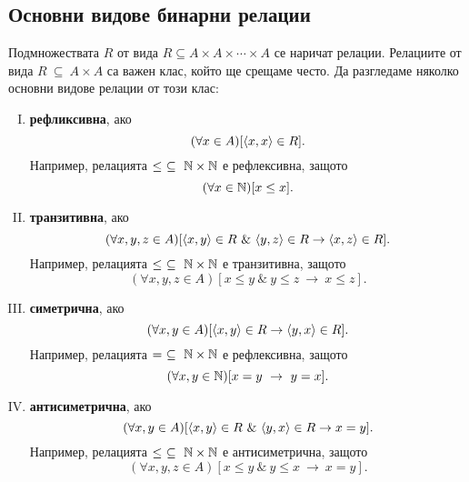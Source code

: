 \subsection*{Основни видове бинарни релации}

Подмножествата $R$ от вида $R \subseteq A\times A\times\cdots\times A$ се наричат релации.
Релациите от вида $R\ \subseteq\ A\times A$ са важен клас, който ще срещаме често.
Да разгледаме няколко основни видове релации от този клас:
\begin{enumerate}[I)]
\item
  {\bf рефликсивна}, ако
  \[(\forall x\in A)[\langle{x,x}\rangle\in R].\]
  Например, релацията $\leq\ \subseteq\ \Nat\times\Nat$ е рефлексивна, защото
  \[(\forall x\in \mathbb{N})[x \leq x].\]
\item
  {\bf транзитивна}, ако
  \[(\forall x,y,z\in A)[\pair{x,y}\in R\ \&\ \pair{y,z}\in R \rightarrow \pair{x,z}\in R].\]
  Например, релацията $\leq\ \subseteq\ \Nat\times\Nat$ е транзитивна, защото
  \[(\forall x,y,z\in A)[x \leq y\ \&\ y \leq z\ \rightarrow\ x\leq z].\]
\item
  {\bf симетрична}, ако
  \[(\forall x,y\in A)[\langle{x,y}\rangle\in R \rightarrow \langle{y,x}\rangle\in R].\]
  Например, релацията $=\ \subseteq\ \mathbb{N}\times\mathbb{N}$ е рефлексивна, защото
  \[(\forall x,y\in \Nat)[x = y\ \rightarrow\ y = x].\]
\item
  {\bf антисиметрична}, ако
  \[(\forall x,y\in A)[\pair{x,y}\in R\ \&\ \pair{y,x}\in R \rightarrow x = y].\]
  Например, релацията $\leq\ \subseteq\ \Nat\times\Nat$ е антисиметрична, защото
  \[(\forall x,y,z\in A)[x \leq y\ \&\ y \leq x\ \rightarrow\ x = y].\]
\end{enumerate}



